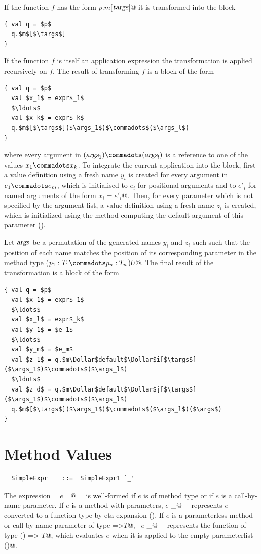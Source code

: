 If the function $f$
has the form \lstinline@$p.m$[$\mbox{\sl targs}$]@ it is transformed into the
block
\begin{lstlisting}
{ val q = $p$
  q.$m$[$\targs$]
}
\end{lstlisting}
If the function $f$ is itself an application expression the transformation
is applied recursively on $f$. The result of transforming $f$ is a block of
the form
\begin{lstlisting}
{ val q = $p$
  val $x_1$ = expr$_1$
  $\ldots$
  val $x_k$ = expr$_k$
  q.$m$[$\targs$]($\args_1$)$\commadots$($\args_l$)
}
\end{lstlisting}
where every argument in $(\args_1) \commadots (\args_l)$ is a reference to
one of the values $x_1 \commadots x_k$. To integrate the current application
into the block, first a value definition using a fresh name $y_i$ is created
for every argument in $e_1 \commadots e_m$, which is initialised to $e_i$ for
positional arguments and to $e'_i$ for named arguments of the form
\lstinline@$x_i=e'_i$@. Then, for every parameter which is not specified
by the argument list, a value definition using a fresh name $z_i$ is created,
which is initialized using the method computing the default argument of
this parameter ().

Let $\mbox{\sl args}$ be a permutation of the generated names $y_i$ and $z_i$ such such
that the position of each name matches the position of its corresponding
parameter in the method type \lstinline@($p_1:T_1 \commadots p_n:T_n$)$U$@.
The final result of the transformation is a block of the form
\begin{lstlisting}
{ val q = $p$
  val $x_1$ = expr$_1$
  $\ldots$
  val $x_l$ = expr$_k$
  val $y_1$ = $e_1$
  $\ldots$
  val $y_m$ = $e_m$
  val $z_1$ = q.$m\Dollar$default$\Dollar$i[$\targs$]($\args_1$)$\commadots$($\args_l$)
  $\ldots$
  val $z_d$ = q.$m\Dollar$default$\Dollar$j[$\targs$]($\args_1$)$\commadots$($\args_l$)
  q.$m$[$\targs$]($\args_1$)$\commadots$($\args_l$)($\args$)
}
\end{lstlisting}


\section{Method Values}\label{sec:meth-vals}

\syntax\begin{lstlisting}
  SimpleExpr    ::=  SimpleExpr1 `_'
\end{lstlisting}

The expression ~~\lstinline@$e$ _@~~ is well-formed if $e$ is of method
type or if $e$ is a call-by-name parameter.  If $e$ is a method with
parameters, \lstinline@$e$ _@~~ represents $e$ converted to a function
type by eta expansion (). If $e$ is a
parameterless method or call-by-name parameter of type 
\lstinline@=>$T$@, ~\lstinline@$e$ _@~~ represents the function of type 
\lstinline@() => $T$@, which evaluates $e$ when it is applied to the empty
parameterlist \lstinline@()@.

